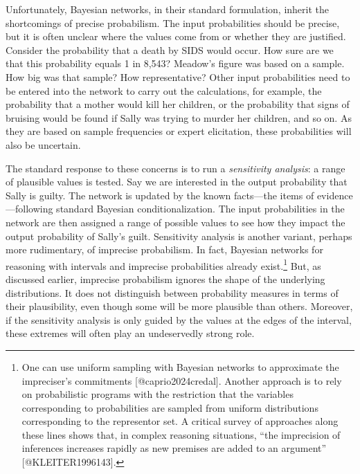 \documentclass[
  letterpaper,
  DIV=11,
  numbers=noendperiod]{scrartcl}
\begin{document}
Unfortunately, Bayesian networks, in their standard formulation, inherit
the shortcomings of precise probabilism. The input probabilities should
be precise, but it is often unclear where the values come from or
whether they are justified. Consider the probability that a death by
SIDS would occur. How sure are we that this probability equals 1 in
8,543? Meadow's figure was based on a sample. How big was that sample?
How representative? Other input probabilities need to be entered into
the network to carry out the calculations, for example, the probability
that a mother would kill her children, or the probability that signs of
bruising would be found if Sally was trying to murder her children, and
so on. As they are based on sample frequencies or expert elicitation,
these probabilities will also be uncertain.

The standard response to these concerns is to run a \emph{sensitivity
analysis}: a range of plausible values is tested. Say we are interested
in the output probability that Sally is guilty. The network is updated
by the known facts---the items of evidence---following standard Bayesian
conditionalization. The input probabilities in the network are then
assigned a range of possible values to see how they impact the output
probability of Sally's guilt. Sensitivity analysis is another variant,
perhaps more rudimentary, of imprecise probabilism. In fact, Bayesian
networks for reasoning with intervals and imprecise probabilities
already exist.\footnote{One can use uniform sampling with Bayesian
  networks to approximate the impreciser's commitments
  {[}@caprio2024credal{]}. Another approach is to rely on probabilistic
  programs with the restriction that the variables corresponding to
  probabilities are sampled from uniform distributions corresponding to
  the representor set. A critical survey of approaches along these lines
  shows that, in complex reasoning situations, ``the imprecision of
  inferences increases rapidly as new premises are added to an
  argument'' {[}@KLEITER1996143{]}.} But, as discussed earlier,
imprecise probabilism ignores the shape of the underlying distributions.
It does not distinguish between probability measures in terms of their
plausibility, even though some will be more plausible than others.
Moreover, if the sensitivity analysis is only guided by the values at
the edges of the interval, these extremes will often play an
undeservedly strong role.
\end{document}
